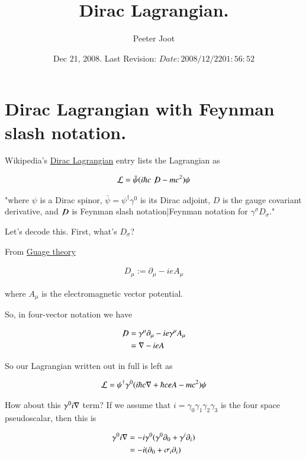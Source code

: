 \documentclass{article}
\title{ Dirac Lagrangian. }
\author{Peeter Joot}
\date{ Dec 21, 2008.  Last Revision: $Date: 2008/12/22 01:56:52 $ }
\newcommand{\Dslash}[0]{ \not\!D }
\begin{document}
\maketitle{}


\section{ Dirac Lagrangian with Feynman slash notation. }

Wikipedia's \href{http://en.wikipedia.org/wiki/Lagrangian#Dirac_Lagrangian}{Dirac Lagrangian} entry lists the Lagrangian as

\begin{align*}
\LL = \bar \psi (i \hbar c \Dslash - mc^2) \psi
\end{align*}

"where $\psi\!$ is a Dirac spinor, $\bar \psi = \psi^\dagger \gamma^0$ is its Dirac adjoint, $D\!$ is the gauge covariant derivative, and $\Dslash$ is Feynman slash notation|Feynman notation for $\gamma^\sigma D_\sigma\!$."

Let's decode this.  First, what's $D_\sigma$?

From \href{http://en.wikipedia.org/wiki/Gauge_covariant_derivative}{Guage theory}

\begin{align*}
D_\mu := \partial_\mu - i e A_\mu
\end{align*}

where $A_\mu$ is the electromagnetic vector potential.

So, in four-vector notation we have

\begin{align*}
\Dslash 
&= \gamma^\mu \partial_\mu - i e \gamma^\mu A_\mu \\
&= \grad - i e A \\
\end{align*}

So our Lagrangian written out in full is left as

\begin{align}\label{eqn:lag1}
\mathcal{L} = \psi^\dagger \gamma^0 ( i \hbar c \nabla + \hbar c e A - mc^2) \psi
\end{align}

How about this $\gamma^0 i \nabla$ term?  If we assume that $i = \gamma_0 \gamma_1 \gamma_2 \gamma_3$ is the four space pseudoscalar, then this is

\begin{align*}
\gamma^0 i \nabla
&= - i \gamma^0 (\gamma^0 \partial_0 + \gamma^i \partial_i) \\
&= - i (\partial_0 + \sigma_i \partial_i) \\
\end{align*}
\end{document}

